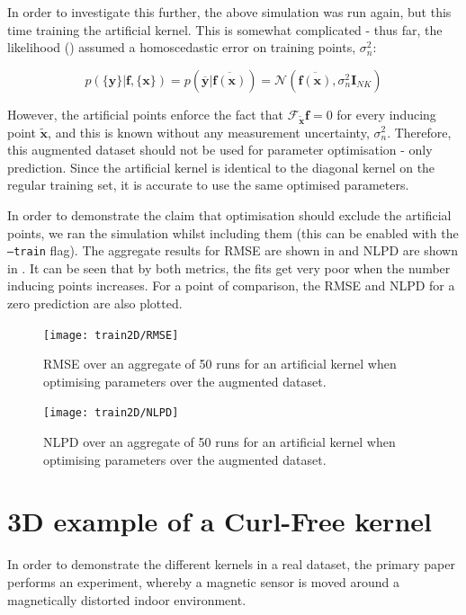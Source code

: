 \documentclass[12pt,a4paper,twoside]{report}
\theoremstyle{definition}
\begin{document}
In order to investigate this further, the above simulation was run again, but this time training the artificial kernel. This is somewhat complicated - thus far, the likelihood () assumed a homoscedastic error on training points, $\sigma^2_n$:

$$ p(\{\mathbf y\}|\mathbf f, \{\mathbf x\}) = p\left(\mathbf{\overline y}| \mathbf{\overline {f(\mathbf x)}} \right) = \mathcal N(\mathbf{\overline {f(\mathbf x)}}, \sigma_n^2 \mathbf I_{NK}) $$

However, the artificial points enforce the fact that $\mathscr F_{\mathbf {\tilde x}} \mathbf f = 0$ for every inducing point $\mathbf {\tilde{x}}$, and this is known without any measurement uncertainty, $\sigma^2_n$. Therefore, this augmented dataset should not be used for parameter optimisation - only prediction. Since the artificial kernel is identical to the diagonal kernel on the regular training set, it is accurate to use the same optimised parameters.

In order to demonstrate the claim that optimisation should exclude the artificial points, we ran the simulation whilst including them (this can be enabled with the \texttt{--train} flag). The aggregate results for RMSE are shown in  and NLPD are shown in . It can be seen that by both metrics, the fits get very poor when the number inducing points increases. For a point of comparison, the RMSE and NLPD for a zero prediction are also plotted.

\begin{figure}[ht]
	\centering
	\texttt{[image: train2D/RMSE]}
	\caption[RMSE when optimising the artificial kernel including inducing points]{RMSE over an aggregate of 50 runs for an artificial kernel when optimising parameters over the augmented dataset.}
	\label{fig:RMSEtrain}
\end{figure}

\begin{figure}[ht]
	\centering
	\texttt{[image: train2D/NLPD]}
	\caption[NLPD when optimising the artificial kernel including inducing points]{NLPD over an aggregate of 50 runs for an artificial kernel when optimising parameters over the augmented dataset.}
	\label{fig:NLPDtrain}
\end{figure}


\section{3D example of a Curl-Free kernel}
In order to demonstrate the different kernels in a real dataset, the primary paper performs an experiment, whereby a magnetic sensor is moved around a magnetically distorted indoor environment.
\end{document}
